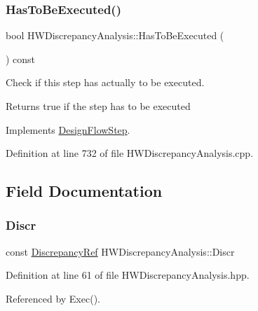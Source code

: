 \subsubsection{\texorpdfstring{Has\+To\+Be\+Executed()}{HasToBeExecuted()}}
{\footnotesize\ttfamily bool H\+W\+Discrepancy\+Analysis\+::\+Has\+To\+Be\+Executed (\begin{DoxyParamCaption}{ }\end{DoxyParamCaption}) const\hspace{0.3cm}{\ttfamily [virtual]}}



Check if this step has actually to be executed. 

\begin{DoxyReturn}{Returns}
true if the step has to be executed 
\end{DoxyReturn}


Implements \hyperlink{classDesignFlowStep_a1783abe0c1d162a52da1e413d5d1ef05}{Design\+Flow\+Step}.



Definition at line 732 of file H\+W\+Discrepancy\+Analysis.\+cpp.



\subsection{Field Documentation}
\mbox{\label{classHWDiscrepancyAnalysis_a90a94fe5a395ef66486bd8f28aa85b49}} 
\subsubsection{\texorpdfstring{Discr}{Discr}}
{\footnotesize\ttfamily const \hyperlink{Discrepancy_8hpp_a9fb5a8938b4eeaafdaf7707f583f0193}{Discrepancy\+Ref} H\+W\+Discrepancy\+Analysis\+::\+Discr\hspace{0.3cm}{\ttfamily [protected]}}



Definition at line 61 of file H\+W\+Discrepancy\+Analysis.\+hpp.



Referenced by Exec().

\mbox{\label{classHWDiscrepancyAnalysis_a6ccd9680ea771b8f16195cb8ed5119e8}} 
